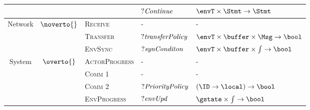 \begin{table}[]
\begin{tabular}{@{}|c|c|l|l|l|@{}}
                        &                           &                         & $?{\it Continue}$     &  $\envT \times \Stmt\rightarrow \Stmt$    \\ \midrule
\multirow{3}{*}{Network} & \multirow{3}{*}{$\noverto{}$}         & \textsc{Receive}                 &       -       &    -  \\ \cmidrule(l){3-5} 
                         &                           & \textsc{Transfer}                &      $?{\it transferPolicy}$        &  $\envT\times \buffer\times \Msg\rightarrow \bool$    \\ \cmidrule(l){3-5} 
                         &                           & \textsc{EnvSync}                 &       $?{\it synConditon}$         &   $\envT\times \buffer\times \int\rightarrow \bool$   \\ \midrule
\multirow{4}{*}{System} & \multirow{4}{*}{$\overto{}$}         & \textsc{ActorProgress}           &      -        &    -  \\ \cmidrule(l){3-5} 
                        &                           & \textsc{Comm 1}                  &      -        &   -   \\ \cmidrule(l){3-5} 
                        &                           & \textsc{Comm 2}                  &     $?{\it PriorityPolicy}$         &   $(\ID\rightarrow \local)\rightarrow \bool$   \\ \cmidrule(l){3-5} 
                        &                           & \textsc{EnvProgress}             &     $?{\it envUpd}$        &   $\gstate\times \int\rightarrow \bool $   \\ \bottomrule
\end{tabular}

\end{table}
